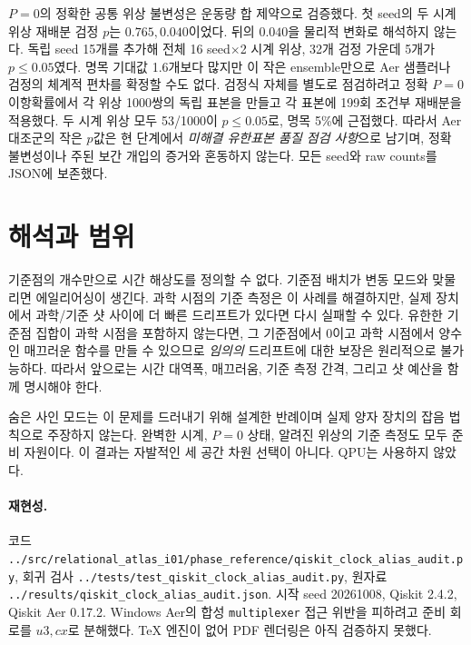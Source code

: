 \documentclass[11pt,a4paper]{article}
\begin{document}
$P=0$의 정확한 공통 위상 불변성은 운동량 합 제약으로 검증했다.
첫 seed의 두 시계 위상 재배분 검정 $p$는 $0.765,0.040$이었다.
뒤의 $0.040$을 물리적 변화로 해석하지 않는다. 독립 seed 15개를
추가해 전체 16 seed$\times$2 시계 위상, 32개 검정 가운데
5개가 $p\le0.05$였다. 명목 기대값 1.6개보다 많지만 이 작은
ensemble만으로 Aer 샘플러나 검정의 체계적 편차를 확정할 수도 없다.
검정식 자체를 별도로 점검하려고 정확 $P=0$ 이항확률에서 각 위상
1000쌍의 독립 표본을 만들고 각 표본에 199회 조건부 재배분을 적용했다.
두 시계 위상 모두 53/1000이 $p\le0.05$로, 명목 5\%에 근접했다.
따라서 Aer 대조군의 작은 $p$값은 현 단계에서 \emph{미해결 유한표본
품질 점검 사항}으로 남기며, 정확 불변성이나 주된 보간 개입의
증거와 혼동하지 않는다. 모든 seed와 raw counts를 JSON에 보존했다.

\section{해석과 범위}
기준점의 개수만으로 시간 해상도를 정의할 수 없다. 기준점 배치가
변동 모드와 맞물리면 에일리어싱이 생긴다. 과학 시점의 기준 측정은
이 사례를 해결하지만, 실제 장치에서 과학/기준 샷 사이에 더 빠른
드리프트가 있다면 다시 실패할 수 있다. 유한한 기준점 집합이
과학 시점을 포함하지 않는다면, 그 기준점에서 0이고 과학 시점에서
양수인 매끄러운 함수를 만들 수 있으므로 \emph{임의의} 드리프트에
대한 보장은 원리적으로 불가능하다. 따라서 앞으로는 시간 대역폭,
매끄러움, 기준 측정 간격, 그리고 샷 예산을 함께 명시해야 한다.

숨은 사인 모드는 이 문제를 드러내기 위해 설계한 반례이며 실제
양자 장치의 잡음 법칙으로 주장하지 않는다. 완벽한 시계, $P=0$
상태, 알려진 위상의 기준 측정도 모두 준비 자원이다. 이 결과는
자발적인 세 공간 차원 선택이 아니다. QPU는 사용하지 않았다.

\paragraph{재현성.} 코드
\texttt{../src/relational\_atlas\_i01/phase\_reference/qiskit\_clock\_alias\_audit.py}, 회귀 검사
\texttt{../tests/test\_qiskit\_clock\_alias\_audit.py}, 원자료
\texttt{../results/qiskit\_clock\_alias\_audit.json}.
시작 seed 20261008, Qiskit 2.4.2, Qiskit Aer 0.17.2.
Windows Aer의 합성 \texttt{multiplexer} 접근 위반을 피하려고
준비 회로를 $u3,cx$로 분해했다. TeX 엔진이 없어 PDF 렌더링은
아직 검증하지 못했다.
\end{document}

